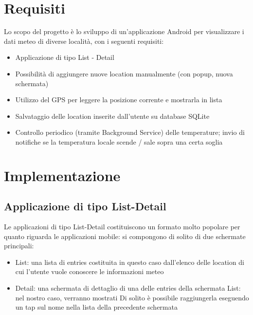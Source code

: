 \documentclass[twoside]{supsistudent}
\begin{document}
\maketitle
\onehalfspacing
\frontmatter


\tableofcontents


\newpage
\mainmatter
{}
\setcounter{page}{1}

\chapter{Requisiti}
Lo scopo del progetto è lo sviluppo di un'applicazione Android per visualizzare i dati meteo di diverse località, con i seguenti requisiti:
\begin{itemize}
\item Applicazione di tipo List - Detail
\item Possibilità di aggiungere nuove location manualmente (con popup, nuova schermata)
\item Utilizzo del GPS per leggere la posizione corrente e mostrarla in lista
\item Salvataggio delle location inserite dall'utente su database SQLite
\item Controllo periodico (tramite Background Service) delle temperature; invio di notifiche se la temperatura locale scende / sale sopra una certa soglia
\end{itemize}


\chapter{Implementazione}


\section{Applicazione di tipo List-Detail}

Le applicazioni di tipo List-Detail costituiscono un formato molto popolare per quanto riguarda le applicazioni mobile: si compongono di solito di due schermate principali:

\begin{itemize}
\item List: una lista di entries costituita in questo caso dall'elenco delle location di cui l'utente vuole conoscere le informazioni meteo

\item Detail: una schermata di dettaglio di una delle entries della schermata List: nel nostro caso, verranno mostrati Di solito è possibile raggiungerla eseguendo un tap sul nome nella lista della precedente schermata
\end{itemize}
\end{document}
